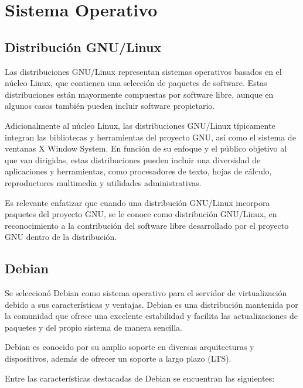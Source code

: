 		\vspace{0.3cm}
		
	
	\section{Sistema Operativo}
		
		\subsection{Distribución GNU/Linux}
			
		Las distribuciones GNU/Linux representan sistemas operativos basados en el núcleo Linux, que contienen una selección de paquetes de software. Estas distribuciones están mayormente compuestas por software libre, aunque en algunos casos también pueden incluir software propietario.\par
		
		Adicionalmente al núcleo Linux, las distribuciones GNU/Linux típicamente integran las bibliotecas y herramientas del proyecto GNU, así como el sistema de ventanas X Window System. En función de su enfoque y el público objetivo al que van dirigidas, estas distribuciones pueden incluir una diversidad de aplicaciones y herramientas, como procesadores de texto, hojas de cálculo, reproductores multimedia y utilidades administrativas.\par
		
		Es relevante enfatizar que cuando una distribución GNU/Linux incorpora paquetes del proyecto GNU, se le conoce como distribución GNU/Linux, en reconocimiento a la contribución del software libre desarrollado por el proyecto GNU dentro de la distribución.\par	
					

		\subsection{Debian}\label{sub:debian}
			

			Se seleccionó Debian como sistema operativo para el servidor de virtualización debido a sus características y ventajas. Debian es una distribución mantenida por la comunidad que ofrece una excelente estabilidad y facilita las actualizaciones de paquetes y del propio sistema de manera sencilla.

			Debian es conocido por su amplio soporte en diversas arquitecturas y dispositivos, además de ofrecer un soporte a largo plazo (LTS).

			Entre las características destacadas de Debian se encuentran las siguientes:
		

